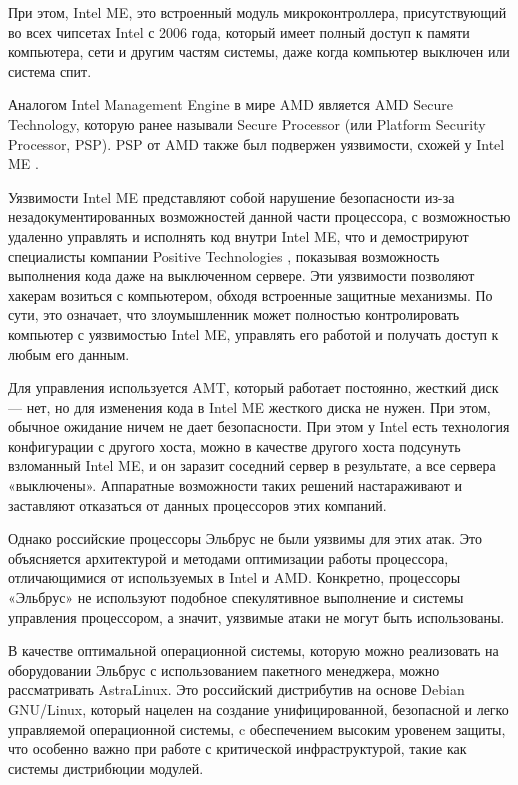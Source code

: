 При этом, Intel ME, это встроенный модуль микроконтроллера, присутствующий во всех чипсетах Intel с 2006 года, который имеет полный доступ к памяти компьютера, сети и другим частям системы, даже когда компьютер выключен или система спит.

Аналогом Intel Management Engine в мире AMD является AMD Secure Technology, которую ранее называли Secure Processor (или Platform Security Processor, PSP). PSP от AMD также был подвержен уязвимости, схожей у Intel ME \cite{risk:amdpsp}.

Уязвимости Intel ME представляют собой нарушение безопасности из-за незадокументированных возможностей данной части процессора, с возможностью удаленно управлять и исполнять код внутри Intel ME, что и демострируют специалисты компании Positive Technologies \cite{risk:intelme}, показывая возможность выполнения кода даже на выключенном сервере. Эти уязвимости позволяют хакерам возиться с компьютером, обходя встроенные защитные механизмы. По сути, это означает, что злоумышленник может полностью контролировать компьютер с уязвимостью Intel ME, управлять его работой и получать доступ к любым его данным.

Для управления используется AMT, который работает постоянно, жесткий диск — нет, но для изменения кода в  Intel ME жесткого диска не нужен. При этом, обычное ожидание ничем не дает безопасности. При этом у Intel есть технология конфигурации с другого хоста, можно в качестве другого хоста подсунуть взломанный Intel ME, и он заразит соседний сервер в результате, а все сервера «выключены». Аппаратные возможности таких решений настараживают и заставляют отказаться от данных процессоров этих компаний.

Однако российские процессоры Эльбрус не были уязвимы для этих атак. Это объясняется архитектурой и методами оптимизации работы процессора, отличающимися от используемых в Intel и AMD. Конкретно, процессоры «Эльбрус» не используют подобное спекулятивное выполнение и системы управления процессором, а значит, уязвимые атаки не могут быть использованы. \cite{risk:elbrus_no_spectre}

В качестве оптимальной операционной системы, которую можно реализовать на оборудовании Эльбрус с использованием пакетного менеджера, можно рассматривать AstraLinux. Это российский дистрибутив на основе Debian GNU/Linux, который нацелен на создание унифицированной, безопасной и легко управляемой операционной системы, c обеспечением высоким уровенем защиты, что особенно важно при работе с критической инфраструктурой, такие как системы дистрибюции модулей.


